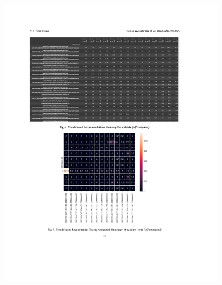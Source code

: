 \begin{figure}[h!]
\centering
\includegraphics[width=\textwidth]{images/appendix/papers/trends/Exploration of the possibility of infusing Social Media Trends into generating NFT Recommendations 11.jpeg}
\end{figure}

